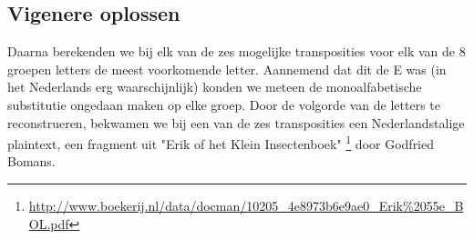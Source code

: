 \subsection{Vigenere oplossen}
Daarna berekenden we bij elk van de zes mogelijke transposities voor elk van de 8 groepen letters de meest voorkomende letter. Aannemend dat dit de E was (in het Nederlands erg waarschijnlijk) konden we meteen de monoalfabetische substitutie ongedaan maken op elke groep. Door de volgorde van de letters te reconstrueren, bekwamen we bij een van de zes transposities een Nederlandstalige plaintext, een fragment uit "Erik of het Klein Insectenboek" \footnote{\url{http://www.boekerij.nl/data/docman/10205_4e8973b6e9ae0_Erik\%2055e_BOL.pdf}} door Godfried Bomans.


